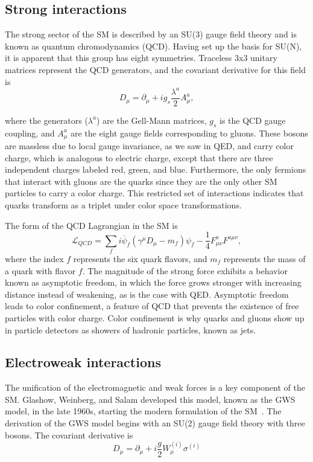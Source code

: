 \subsection{Strong interactions}

The strong sector of the SM is described by an SU(3) gauge field theory and is known as quantum chromodynamics (QCD). Having set up the basis for SU(N), it is apparent that this group has eight symmetries. Traceless 3x3 unitary matrices represent the QCD generators, and the covariant derivative for this field is 
\begin{equation}
    D_{\mu} = \partial_\mu + i g_s \frac{\lambda^a}{2} A^a_\mu,
    \label{eqn:cov_deriv_U1}
\end{equation}

\noindent where the generators ($\lambda^a$) are the Gell-Mann matrices, $g_s$ is the QCD gauge coupling, and $A^a_\mu$ are the eight gauge fields corresponding to gluons. These bosons are massless due to local gauge invariance, as we saw in QED, and carry color charge, which is analogous to electric charge, except that there are three independent charges labeled red, green, and blue. Furthermore, the only fermions that interact with gluons are the quarks since they are the only other SM particles to carry a color charge. This restricted set of interactions indicates that quarks transform as a triplet under color space transformations. 

The form of the QCD Lagrangian in the SM is
\begin{equation}
    \mathcal{L}_{QCD} = \sum_f i \overline{\psi}_f (\gamma^\mu D_\mu - m_f) \psi_f - \frac{1}{4} F^a_{\mu\nu}F^{a\mu\nu},
\end{equation}
where the index $f$ represents the six quark flavors, and $m_f$ represents the mass of a quark with flavor $f$. The magnitude of the strong force exhibits a behavior known as asymptotic freedom, in which the force grows stronger with increasing distance instead of weakening, as is the case with QED. Asymptotic freedom leads to color confinement, a feature of QCD that prevents the existence of free particles with color charge. Color confinement is why quarks and gluons show up in particle detectors as showers of hadronic particles, known as jets.

\subsection{Electroweak interactions}

The unification of the electromagnetic and weak forces is a key component of the SM. Glashow, Weinberg, and Salam developed this model, known as the GWS model, in the late 1960s, starting the modern formulation of the SM~\cite{gws}. The derivation of the GWS model begins with an SU(2) gauge field theory with three bosons. The covariant derivative is
\begin{equation}
    D_{\mu} = \partial_{\mu} + i \frac{g}{2} W_{\mu}^{(i)}\sigma^{(i)}
    \label{eqn:cov_deriv_weak}
\end{equation}

